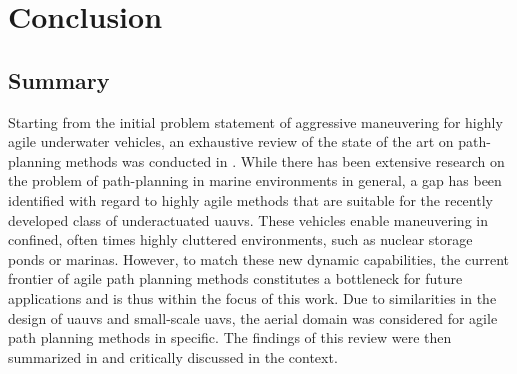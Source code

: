 \chapter{Conclusion}\label{chap:conclusion}


\section{Summary}


Starting from the initial problem statement of aggressive maneuvering for highly agile underwater vehicles, an exhaustive review of the state of the art on path-planning methods was conducted in . While there has been extensive research on the problem of path-planning in marine environments in general, a gap has been identified with regard to highly agile methods that are suitable for the recently developed class of underactuated \acp{uauv}. These vehicles enable maneuvering in confined, often times highly cluttered environments, such as nuclear storage ponds or marinas. However, to match these new dynamic capabilities, the current frontier of agile path planning methods constitutes a bottleneck for future applications and is thus within the focus of this work. 
Due to similarities in the design of \acp{uauv} and small-scale \acp{uav}, the aerial domain was considered for agile path planning methods in specific.
The findings of this review were then summarized in  and critically discussed in the context.



